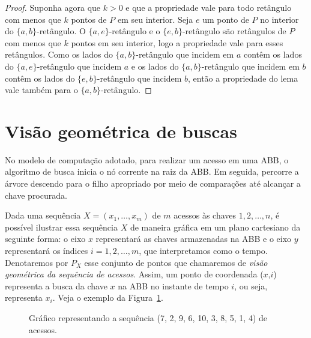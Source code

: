 \begin{proof}
    Suponha agora que $k > 0$ e que a propriedade vale para todo retângulo com menos que $k$ pontos de $P$ em seu interior. Seja $e$ um ponto de $P$ no interior do $\{a,b\}$-retângulo. O $\{a,e\}$-retângulo e o $\{e,b\}$-retângulo são retângulos de $P$ com menos que $k$ pontos em seu interior, logo a propriedade vale para esses retângulos. Como os lados do $\{a,b\}$-retângulo que incidem em $a$ contêm os lados do $\{a,e\}$-retângulo que incidem $a$ e os lados do $\{a,b\}$-retângulo que incidem em $b$ contêm os lados do $\{e,b\}$-retângulo que incidem $b$, então a propriedade do lema vale também para o $\{a,b\}$-retângulo.
\end{proof}

\section{Visão geométrica de buscas}

No modelo de computação adotado, para realizar um acesso em uma ABB, o algoritmo de busca inicia o nó corrente na raiz da ABB. Em seguida, percorre a árvore descendo para o filho apropriado por meio de comparações até alcançar a chave procurada.

Dada uma sequência $X = (x_{1},\ldots,x_{m})$ de $m$ acessos às chaves $1,2,\ldots,n$, é possível ilustrar essa sequência $X$ de maneira gráfica em um plano cartesiano da seguinte forma: o eixo $x$ representará as chaves armazenadas na ABB e o eixo $y$ representará os índices $i = 1,2,\ldots,m$, que interpretamos como o tempo. Denotaremos por $P_X$ esse conjunto de pontos que chamaremos de \textit{visão geométrica da sequência de acessos}. Assim, um ponto de coordenada ($x$,$i$) representa a busca da chave $x$ na ABB no instante de tempo $i$, ou seja, representa $x_i$. Veja o exemplo da Figura~\ref{fig:busca_padrao}.

\begin{figure}
    \caption{Gráfico representando a sequência (7, 2, 9, 6, 10, 3, 8, 5, 1, 4) de acessos.}
\label{fig:busca_padrao}
\end{figure}

